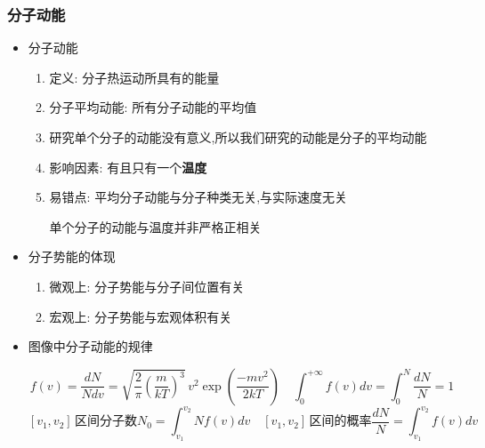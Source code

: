 \documentclass{article}
\begin{document}
\subsubsection{分子动能}
\begin{itemize}
    \item 分子动能
          \begin{enumerate}[label = (\arabic*)]
              \item 定义: 分子热运动所具有的能量
              \item 分子平均动能: 所有分子动能的平均值
              \item 研究单个分子的动能没有意义,所以我们研究的动能是分子的平均动能
              \item 影响因素: 有且只有一个\textbf{温度}
              \item 易错点: 平均分子动能与分子种类无关,与实际速度无关

                    \hspace{3.7em}单个分子的动能与温度并非严格正相关
          \end{enumerate}
    \item 分子势能的体现
          \begin{enumerate}[label = (\arabic*)]
              \item 微观上: 分子势能与分子间位置有关
              \item 宏观上: 分子势能与宏观体积有关
          \end{enumerate}
    \item 图像中分子动能的规律

          \vspace{-1em}
          \hspace{-0.9em}\begin{adjustbox}{minipage=0.65\linewidth, bgcolor=gray!20, padding=1em}
              \small %
              $$ f(v)= \frac{dN}{Ndv} ={\sqrt {{\frac {2}{\pi }}\left({\frac {m}{kT}}\right)^{3}}}\,v^{2}\exp \left({\frac {-mv^{2}}{2kT}}\right)  \quad
                  \int_{0}^{+\infty} f(v) dv  = \int_{0}^{N} \frac{dN}{N} = 1
              $$
              $$
                  [v_{1},v_{2}] \, \text{区间分子数} N_{0} = \int_{v_{1}}^{v_{2}} N f(v) dv  \quad [v_{1},v_{2}] \, \text{区间的概率} \frac{dN}{N} = \int_{v_{1}}^{v_{2}} f(v) dv
              $$
          \end{adjustbox}
          \vspace{-1em}


\end{itemize}
\end{document}

